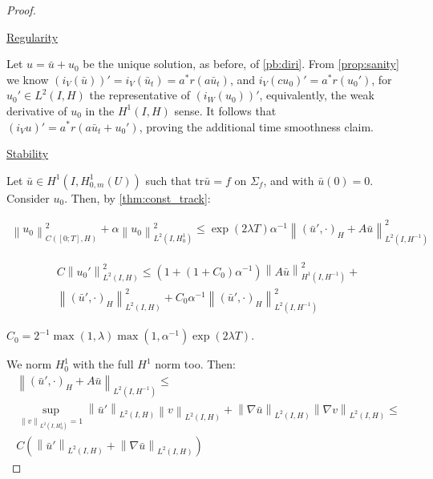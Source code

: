 \documentclass[english,a4paper,9pt,oneside]{scrbook}	%
\theoremstyle{break}
\newenvironment{mproof}[1][\proofname]{%
  \begin{proof}[#1]$ $\par\nobreak\ignorespaces
}{%
  \end{proof}
}
\renewcommand*{\proofname}{Proof}
\theoremstyle{remark}
\newcommand{\ds}{\displaystyle}
\newcommand{\norm}[1]{\left\lVert#1\right\rVert}
\newcommand{\tr}{\text{tr}}
\begin{document}
\begin{appendices}
\begin{mproof}

\underline{Regularity}

Let $u=\bar{u}+u_0$ be the unique solution, as before, of \cref{pb:diri}. From \cref{prop:sanity} we know $(i_V(\bar{u}))'=i_V(\bar{u}_t)=a^*r(a\bar{u}_t)$, and $i_V(cu_0)'=a^*r (u_0')$, for $u_0' \in L^2(I,H)$ the representative of $(i_W(u_0))'$, equivalently, the weak derivative of $u_0$ in the $H^1(I,H)$ sense. It follows that $(i_Vu)' = a^*r(a\bar{u}_t+u_0')$, proving the additional time smoothness claim.

\underline{Stability}

Let $\bar{u}\in H^1(I,H^1_{0,m}(U))$ such that $\tr \bar{u} =f$ on $\Sigma_f$, and with $\bar{u}(0)=0$. Consider $u_0$. Then, by \cref{thm:const_track}:


\begin{align*}
\norm{u_0}^2_{C([0;T],H)}+\alpha\norm{u_0}_{L^2(I,H^1_0)}^2\leq \exp(2\lambda T)\alpha^{-1}\norm{(\bar{u}',\cdot)_H+ A \bar{u}}^2_{L^2(I,H^{-1})}
\end{align*}

\begin{align*}
C\norm{u_0'}^2_{L^2(I,H)}\leq 
(1+(1+C_0)\alpha^{-1})\norm{A \bar{u}}^2_{H^1(I, H^{-1})}+\\
\norm{(\bar{u}',\cdot)_H}_{L^2(I,H)}^2+C_0\alpha^{-1}\norm{(\bar{u}',\cdot)_H}^2_{L^2(I,H^{-1})}
\end{align*}

$C_0 = \ds 2^{-1}\max(1,\lambda)\max(1,\alpha^{-1})\exp(2\lambda T)$.

We norm $H^1_0$ with the full $H^1$ norm too. Then:
\begin{align*}
\norm{(\bar{u}',\cdot)_H+ A \bar{u}}_{L^2(I,H^{-1})}\leq \\
\sup_{\norm{v}_{L^2(I,H^{1}_0)}=1}\norm{\bar{u}'}_{L^2(I,H)}\norm{v}_{L^2(I,H)}+\norm{\nabla \bar{u}}_{L^2(I,H)}\norm{\nabla v}_{L^2(I,H)}\leq \\C(\norm{\bar{u}'}_{L^2(I,H)}+\norm{\nabla \bar{u}}_{L^2(I,H)})
\end{align*}


\end{mproof}
\end{appendices}
\end{document}
